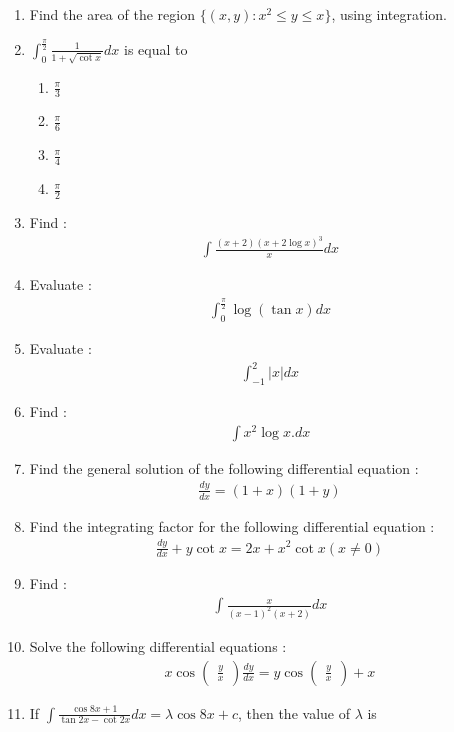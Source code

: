 \documentclass{article}
\newcommand{\myvec}[1]{\ensuremath{\begin{pmatrix}#1\end{pmatrix}}}
\begin{document}
\begin{enumerate}
	\item Find the area of the region $\lbrace (x,y) :  x^2\leq y \leq x\rbrace$, using integration.
	\item $\int_0^\frac{\pi}{2} \frac{1}{1+\sqrt{\cot x}} dx$ is equal to
		\begin{enumerate}
			\item $\frac{\pi}{3}$
			\item $\frac{\pi}{6}$
			\item $\frac{\pi}{4}$
			\item $\frac{\pi}{2}$
		\end{enumerate}
	\item Find : 
		\begin{align}
			\int \frac{(x+2)(x+2 \log x)^3}{x}dx
		\end{align}
	\item Evaluate : 
		\begin{align}
			\int_0^\frac{\pi}{2} \log(\tan x)dx
		\end{align}
	\item Evaluate : 
		\begin{align}
			\int_{-1}^2 |x| dx
		\end{align}
	\item Find :
		\begin{align}
			\int x^2 \log x . dx
		\end{align}
	\item Find the general solution of the following differential equation : 
		\begin{align}
			\frac{dy}{dx}=(1+x)(1+y)
		\end{align}
	\item Find the integrating factor for the following differential equation :
		\begin{align}
			\frac{dy}{dx}+y\cot x=2x+x^2\cot x  (x\neq0)
		\end{align}
	\item Find : 
		\begin{align}
			\int \frac{x}{(x-1)^2(x+2)}dx
		\end{align}
	\item Solve the following differential equations :
		\begin{align}
			x\cos\myvec{\frac{y}{x}} \frac{dy}{dx} = y \cos\myvec{\frac{y}{x}}+x
		\end{align}
	\item If $\int \frac{\cos8x + 1}{\tan2x - \cot2x}dx = \lambda \cos8x + c$, then the value of $\lambda$ is
		\begin{enumerate}

\end{enumerate}
\end{enumerate}
\end{document}
